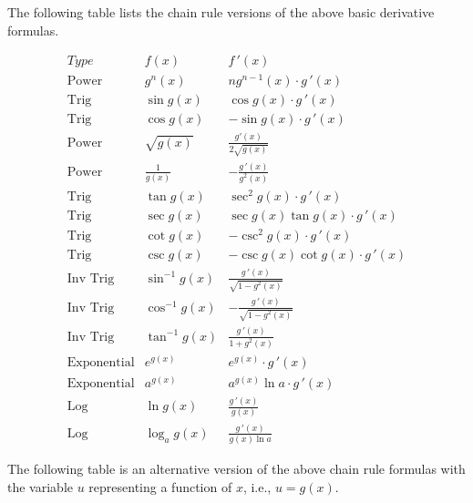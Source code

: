 \documentclass[handout]{ximera}
\begin{document}
The following table lists the chain rule versions of the above basic derivative formulas.

\begin{center}
\[
\begin{array}{c|c|c}
		Type & f(x) & f\,'(x)  \\
		\hline
		\text{Power} & g^n(x) & ng^{n-1}(x)\cdot g\,'(x)  \\[8pt]
		\hline
		\text{Trig} & \sin g(x)  & \cos g(x)  \cdot g\,'(x) \\[8pt]
		\text{Trig} & \cos g(x)  & -\sin g(x)\cdot g\,'(x)  \\[8pt]
		\hline
		\text{Power} & \sqrt{g(x)} & \displaystyle \frac{g'(x)}{2\sqrt {g(x)}}\\[8pt]
		\text{Power} & \displaystyle \frac{1}{g(x)} & -\displaystyle \frac{g\,'(x)}{g^2(x)}\\[8pt]
	  \hline
	  \text{Trig} & \tan g(x)  & \sec^2 g(x)  \cdot g\,'(x) \\[8pt]
		\text{Trig} & \sec g(x)  & \sec g(x) \tan g(x)  \cdot g\,'(x) \\[8pt]
		\hline
		\text{Trig} & \cot g(x)  & -\csc^2 g(x)  \cdot g\,'(x)  \\[8pt]
		\text{Trig} & \csc g(x)  & -\csc g(x) \cot g(x)  \cdot g\,'(x)  \\[8pt]
		\hline
		\text{Inv Trig} & \sin^{-1} g(x)  &   \displaystyle \frac{g\,'(x)}{\sqrt{1-g^2(x)}}  \\[8pt]
		\text{Inv Trig} & \cos^{-1} g(x)  &   \displaystyle -\frac{g\,'(x)}{\sqrt{1-g^2(x)}}\\[8pt]
		\text{Inv Trig} & \tan^{-1} g(x)  &   \displaystyle \frac{g\,'(x)}{1+g^2(x)} \\[8pt]
		\hline
		\text{Exponential} & e^{g(x)} & e^{g(x)} \cdot g\,'(x) \\[8pt]
		\text{Exponential} & a^{g(x)} & a^{g(x)}\ln a \cdot g\,'(x) \\[8pt]
		\hline
		\text{Log} & \ln g(x)  &   \displaystyle \frac{g\,'(x)}{g(x)} \\[8pt]
		\text{Log} & \log_a g(x)  &   \displaystyle \frac{g\,'(x)}{g(x)\ln a}
	\end{array}
    \]
\end{center}


The following table is an alternative version of the above chain rule formulas  
with the variable $u$ representing a function of $x$, i.e., $u = g(x)$.
\end{document}
